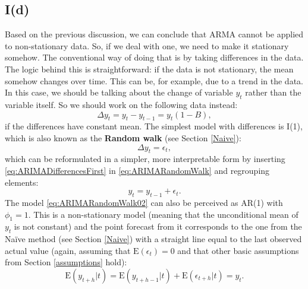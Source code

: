 \documentclass[
]{book}
\theoremstyle{definition}
\theoremstyle{definition}
\theoremstyle{definition}
\theoremstyle{definition}
\theoremstyle{remark}
\begin{document}
\hypertarget{Differences}{%
\subsection{I(d)}\label{Differences}}

Based on the previous discussion, we can conclude that ARMA cannot be applied to non-stationary data. So, if we deal with one, we need to make it stationary somehow. The conventional way of doing that is by taking differences in the data. The logic behind this is straightforward: if the data is not stationary, the mean somehow changes over time. This can be, for example, due to a trend in the data. In this case, we should be talking about the change of variable \(y_t\) rather than the variable itself. So we should work on the following data instead:
\begin{equation}
  \Delta y_t = y_t -y_{t-1} = y_t (1 -B),
  \label{eq:ARIMADifferencesFirst}
\end{equation}
if the differences have constant mean. The simplest model with differences is I(1), which is also known as the \textbf{Random walk} (see Section \ref{Naive}):
\begin{equation}
  \Delta y_t = \epsilon_t,
  \label{eq:ARIMARandomWalk}
\end{equation}
which can be reformulated in a simpler, more interpretable form by inserting \eqref{eq:ARIMADifferencesFirst} in \eqref{eq:ARIMARandomWalk} and regrouping elements:
\begin{equation}
  y_t = y_{t-1} + \epsilon_t.
  \label{eq:ARIMARandomWalk02}
\end{equation}
The model \eqref{eq:ARIMARandomWalk02} can also be perceived as AR(1) with \(\phi_1=1\). This is a non-stationary model (meaning that the unconditional mean of \(y_t\) is not constant) and the point forecast from it corresponds to the one from the Naïve method (see Section \ref{Naive}) with a straight line equal to the last observed actual value (again, assuming that \(\mathrm{E}(\epsilon_{t})=0\) and that other basic assumptions from Section \ref{assumptions} hold):
\begin{equation}
  \mathrm{E}(y_{t+h}|t) = \mathrm{E}(y_{t+h-1}|t) + \mathrm{E}(\epsilon_{t+h}|t) = y_{t} .
  \label{eq:ARIMARandomWalkForecast}
\end{equation}
\end{document}
